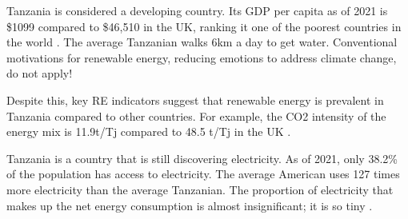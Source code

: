 





Tanzania is considered a developing country. Its GDP per capita as of 2021 is \$1099 compared to \$46,510 in the UK, ranking it one of the poorest countries in the world \cite{worldBank}. The average Tanzanian walks 6km a day to get water. Conventional motivations for renewable energy, reducing emotions to address climate change, do not apply!

Despite this, key RE indicators suggest that renewable energy is prevalent in Tanzania compared to other countries. For example, the CO2 intensity of the energy mix is 11.9t/Tj compared to 48.5 t/Tj in the UK \cite{iea}.  

Tanzania is a country that is still discovering electricity. As of 2021, only 38.2\% of the population has access to electricity. The average American uses 127 times more electricity than the average Tanzanian. The proportion of electricity that makes up the net energy consumption is almost insignificant; it is so tiny \cite{iea}.



